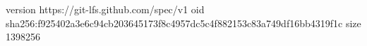 version https://git-lfs.github.com/spec/v1
oid sha256:f925402a3e6c94cb203645173f8c4957dc5c4f882153c83a749df16bb4319f1c
size 1398256
